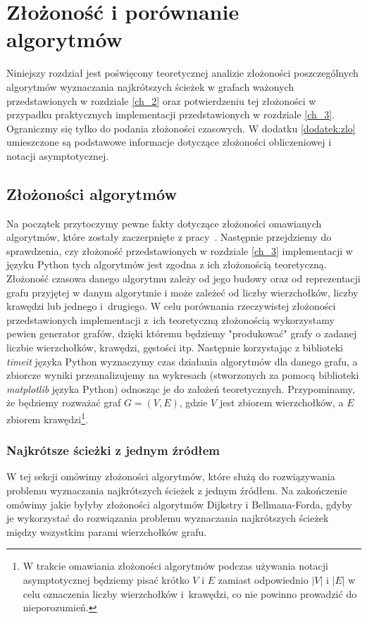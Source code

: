 \documentclass[12pt,a4paper]{book}
\theoremstyle{definition}
\numberwithin{equation}{chapter}
\begin{document}
\chapter{Złożoność i porównanie algorytmów}\label{ch_4}

Niniejszy rozdział jest poświęcony teoretycznej analizie złożoności poszczególnych algorytmów wyznaczania najkrótszych ścieżek w grafach ważonych przedstawionych w rozdziale \ref{ch_2} oraz potwierdzeniu tej złożoności w przypadku praktycznych implementacji przedstawionych w rozdziale \ref{ch_3}. Ograniczmy się tylko do podania złożoności czasowych. W dodatku \ref{dodatek:zlo} umieszczone są podstawowe informacje dotyczące złożoności obliczeniowej i notacji asymptotycznej.

\section{Złożoności algorytmów}
Na początek przytoczymy pewne fakty dotyczące złożoności omawianych algorytmów, które zostały zaczerpnięte z pracy~\cite{CORMEN}. Następnie przejdziemy do sprawdzenia, czy złożoność przedstawionych w rozdziale \ref{ch_3} implementacji w języku Python tych algorytmów jest zgodna z ich złożonością teoretyczną. Złożoność czasowa danego algorytmu zależy od jego budowy oraz od reprezentacji grafu przyjętej w danym algorytmie i może zależeć od liczby wierzchołków, liczby krawędzi lub jednego i~drugiego. W celu porównania rzeczywistej złożoności przedstawionych implementacji z~ich teoretyczną złożonością wykorzystamy pewien generator grafów, dzięki któremu będziemy "produkować" grafy o zadanej liczbie wierzchołków, krawędzi, gęstości itp. Następnie korzystając z biblioteki \textit{timeit} języka Python wyznaczymy czas działania algorytmów dla danego grafu, a zbiorcze wyniki przeanalizujemy na wykresach (stworzonych za pomocą biblioteki \textit{matplotlib} języka Python) odnosząc je do założeń teoretycznych. Przypominamy, że będziemy rozważać graf $G = (V, E)$, gdzie $V$ jest zbiorem wierzchołków, a $E$ zbiorem krawędzi\footnote{W trakcie omawiania złożoności algorytmów podczas używania notacji asymptotycznej będziemy pisać krótko $V$ i $E$ zamiast odpowiednio $|V|$ i $|E|$ w celu oznaczenia liczby wierzchołków i~krawędzi, co nie powinno prowadzić do nieporozumień.}.

\subsection{Najkrótsze ścieżki z jednym źródłem}
W tej sekcji  omówimy złożoności algorytmów, które służą do rozwiązywania problemu wyznaczania najkrótszych ścieżek z jednym źródłem. Na zakończenie omówimy jakie byłyby złożoności algorytmów Dijkstry i Bellmana-Forda, 
gdyby je wykorzystać do rozwiązania problemu wyznaczania najkrótszych ścieżek między wszystkim parami wierzchołków grafu.
\end{document}
